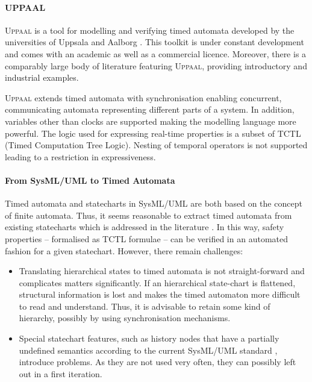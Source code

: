 \paragraph{UPPAAL}

\textsc{Uppaal} is a tool for modelling and verifying timed automata
developed by the universities of Uppsala and Aalborg
\cite{UppaalTutorial04}. This toolkit is under constant development
and comes with an academic as well as a commercial licence. Moreover,
there is a comparably large body of literature featuring
\textsc{Uppaal}, providing introductory and industrial examples.

\textsc{Uppaal} extends timed automata with synchronisation enabling
concurrent, communicating automata representing different parts of a
system. In addition, variables other than clocks are supported making
the modelling language more powerful. The logic used for expressing
real-time properties is a subset of TCTL (Timed Computation Tree
Logic). Nesting of temporal operators is not supported leading to a
restriction in expressiveness.

\paragraph{From SysML/UML to Timed Automata}

Timed automata and statecharts in SysML/UML are both based on the
concept of finite automata. Thus, it seems reasonable to extract timed
automata from existing statecharts which is addressed in the
literature \cite{David2002, Knapp2002, Jensen2004}. In this way,
safety properties -- formalised as TCTL formulae -- can be verified in
an automated fashion for a given statechart. However, there remain
challenges:
\begin{itemize}
\item Translating hierarchical states to timed automata is not
  straight-forward and complicates matters significantly. If an
  hierarchical state-chart is flattened, structural information is
  lost and makes the timed automaton more difficult to read and
  understand. Thus, it is advisable to retain some kind of hierarchy,
  possibly by using synchronisation mechanisms.
\item Special statechart features, such as history nodes that have a
  partially undefined semantics according to the current SysML/UML
  standard \cite{fecher_29_2005}, introduce problems. As they are not
  used very often, they can possibly left out in a first iteration.
\end{itemize}

